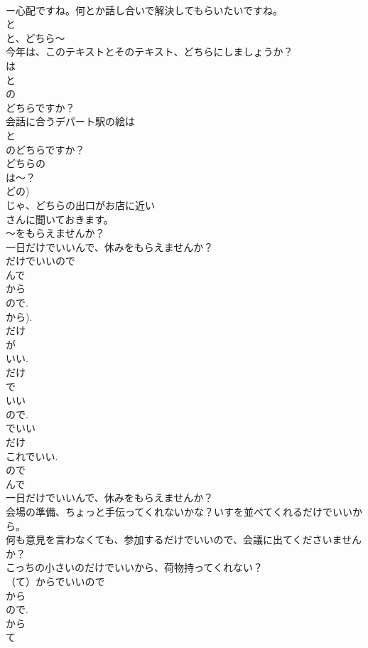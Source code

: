\documentclass[8pt]{extreport}
\begin{document}
\begin{CJK}{UTF8}{min}
\\	ー心配ですね。何とか話し合いで解決してもらいたいですね。	
\\	と
\\	と、どちら～
\\	今年は、このテキストとそのテキスト、どちらにしましょうか？
\\	は
\\	と
\\	の
\\	どちらですか？
\\	会話に合うデパート駅の絵は
\\	と
\\	のどちらですか？
\\	どちらの
\\	は～？
\\	どの)
\\	じゃ、どちらの出口がお店に近い
\\	さんに聞いておきます。	
\\	～をもらえませんか？
\\	一日だけでいいんで、休みをもらえませんか？
\\	だけでいいので
\\	んで 
\\	から 
\\	ので.
\\	から). 
\\	だけ
\\	が
\\	いい. 
\\	だけ
\\	で
\\	いい
\\	ので. 
\\	でいい 
\\	だけ 
\\	これでいい.
\\	ので 
\\	んで 
\\	一日だけでいいんで、休みをもらえませんか？
\\	会場の準備、ちょっと手伝ってくれないかな？いすを並べてくれるだけでいいから。
\\	何も意見を言わなくても、参加するだけでいいので、会議に出てくださいませんか？
\\	こっちの小さいのだけでいいから、荷物持ってくれない？
\\	（て）からでいいので
\\	から 
\\	ので.
\\	から 
\\	て 

\end{CJK}
\end{document}
